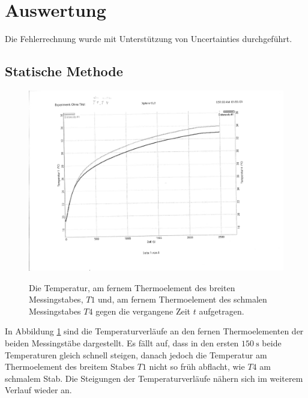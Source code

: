 \section{Auswertung}
\label{sec:Auswertung}
Die Fehlerrechnung wurde mit Unterstützung von Uncertainties \cite{uncertainties} durchgeführt.
\subsection{Statische Methode}
\begin{figure}
	\centering
	\caption{Die Temperatur, am fernem Thermoelement des breiten Messingstabes, $T1$ und, am fernem Thermoelement des schmalen Messingstabes $T4$ gegen die vergangene Zeit $t$ aufgetragen.}
	\includegraphics[width=\linewidth-70pt,height=\textheight-70pt,keepaspectratio]{content/Bilder/T1T4-rotated.pdf}
	\label{fig:Graph1}
\end{figure}
In Abbildung \ref{fig:Graph1} sind die Temperaturverläufe an den fernen Thermoelementen der beiden Messingstäbe dargestellt. Es fällt auf, dass in den ersten $\SI{150}{\second}$ beide Temperaturen gleich schnell steigen, danach jedoch die Temperatur am Thermoelement des breitem Stabes $T1$ nicht so früh abflacht, wie $T4$ am schmalem Stab. Die Steigungen der Temperaturverläufe nähern sich im weiterem Verlauf wieder an.
